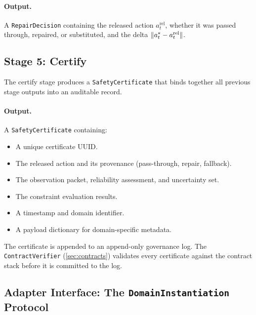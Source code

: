 \paragraph{Output.}  A \texttt{RepairDecision} containing the released action
$a_t^{\mathrm{rel}}$, whether it was passed through, repaired, or substituted,
and the delta $\lVert a_t^{*} - a_t^{\mathrm{rel}}\rVert$.

\subsection{Stage 5: Certify}\label{sec:certify}

The certify stage produces a \texttt{SafetyCertificate} that binds together all
previous stage outputs into an auditable record.

\paragraph{Output.}  A \texttt{SafetyCertificate} containing:
\begin{itemize}[nosep]
  \item A unique certificate UUID.
  \item The released action and its provenance (pass-through, repair, fallback).
  \item The observation packet, reliability assessment, and uncertainty set.
  \item The constraint evaluation results.
  \item A timestamp and domain identifier.
  \item A payload dictionary for domain-specific metadata.
\end{itemize}

The certificate is appended to an append-only governance log.  The
\texttt{ContractVerifier} (\cref{sec:contracts}) validates every certificate
against the contract stack before it is committed to the log.

\subsection{Adapter Interface: The \texttt{DomainInstantiation} Protocol}


